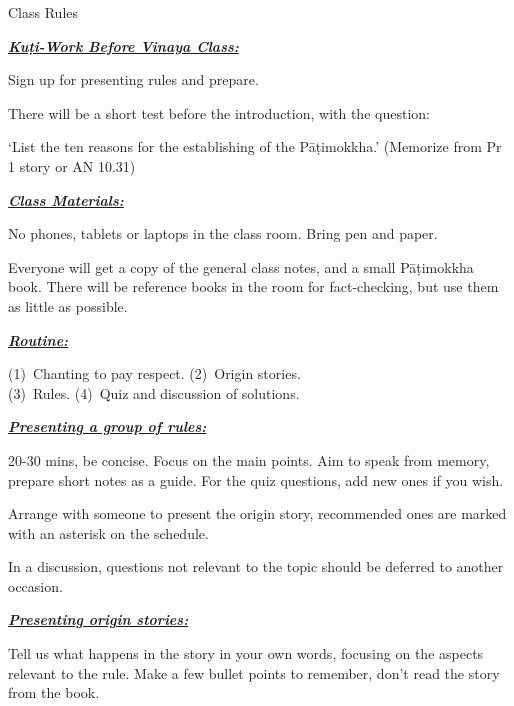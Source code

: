 \documentclass[11pt]{article}
\newcommand\subSectionFmt[1]{%
  {%
  \normalfont%
  \bfseries\itshape%
  \uline{#1}%
  }%
}
\begin{document}

{\LARGE Class Rules}

\begin{multicols}{2}

\subSectionFmt{Kuṭi-Work Before Vinaya Class:}

Sign up for presenting rules and prepare.

There will be a short test before the introduction, with the question:

`List the ten reasons for the establishing of the Pāṭimokkha.' (Memorize from Pr 1 story or AN 10.31)

\subSectionFmt{Class Materials:}

No phones, tablets or laptops in the class room. Bring pen and paper.

Everyone will get a copy of the general class notes, and a small Pāṭimokkha book. There will be reference books in the room for fact-checking, but use them as little as possible.

\columnbreak

\subSectionFmt{Routine:}

(1)~Chanting to pay respect. (2)~Origin stories.\\
(3)~Rules. (4)~Quiz and discussion of solutions.

\subSectionFmt{Presenting a group of rules:}

20-30 mins, be concise. Focus on the main points. Aim to speak from memory, prepare short notes as a guide. For the quiz questions, add new ones if you wish.

Arrange with someone to present the origin story, recommended ones are marked with an asterisk on the schedule.

In a discussion, questions not relevant to the topic should be deferred to another occasion.

\subSectionFmt{Presenting origin stories:}

Tell us what happens in the story in your own words, focusing on the aspects relevant to the rule. Make a few bullet points to remember, don't read the story from the book.

\end{multicols}
\end{document}

